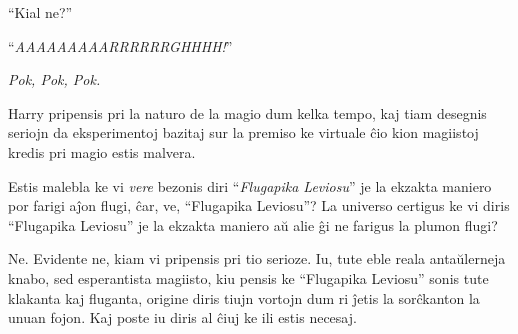 ``Kial ne?''

“\emph{AAAAAAAAARRRRRRGHHHH!}”

\emph{Pok, Pok, Pok.}

Harry pripensis pri la naturo de la magio dum kelka tempo, kaj tiam
desegnis seriojn da eksperimentoj bazitaj sur la premiso ke virtuale
ĉio kion magiistoj kredis pri magio estis malvera.

Estis malebla ke vi \emph{vere} bezonis diri ``\emph{Flugapika
  Leviosu}'' je la ekzakta maniero por farigi aĵon flugi, ĉar, ve,
``Flugapika Leviosu''?  La universo certigus ke vi diris ``Flugapika
Leviosu'' je la ekzakta maniero aŭ alie ĝi ne farigus la plumon flugi?

Ne. Evidente ne, kiam vi pripensis pri tio serioze. Iu, tute eble
reala antaŭlerneja knabo, sed esperantista magiisto, kiu pensis ke
``Flugapika Leviosu'' sonis tute klakanta kaj fluganta, origine diris
tiujn vortojn dum ri ĵetis la sorĉkanton la unuan fojon. Kaj poste iu
diris al ĉiuj ke ili estis necesaj.












